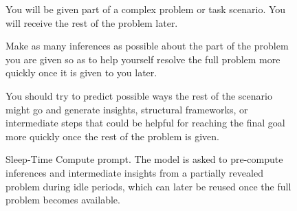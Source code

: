 \begin{figure}[H]
\begin{tcolorbox}[colback=gray!5, colframe=black!60, title=Sleep-Time Compute, fontupper=\small, width=\linewidth]
You will be given part of a complex problem or task scenario. You will receive the rest of the problem later.

Make as many inferences as possible about the part of the problem you are given so as to help yourself resolve the full problem more quickly once it is given to you later.

You should try to predict possible ways the rest of the scenario might go and generate insights, structural frameworks, or intermediate steps that could be helpful for reaching the final goal more quickly once the rest of the problem is given.
\end{tcolorbox}
\caption{Sleep-Time Compute prompt. The model is asked to pre-compute inferences and intermediate insights from a partially revealed problem during idle periods, which can later be reused once the full problem becomes available.}
\label{fig:prompt_sleep_time}
\end{figure}

